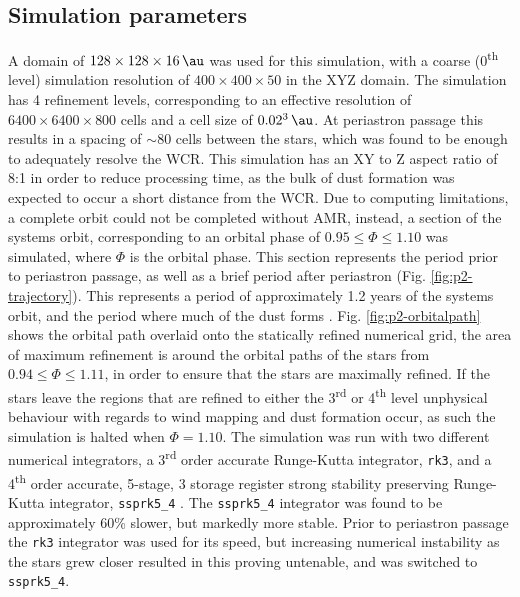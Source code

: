 \documentclass[fleqn,usenatbib]{mnras}
\newcommand{\ts}{\textsuperscript}
\begin{document}
\subsection{Simulation parameters}


A domain of $128 \times 128 \times 16 \, \si{\au}$ was used for this simulation, with a coarse (0\ts{th} level) simulation resolution of $400\times 400 \times 50$ in the XYZ domain.
The simulation has 4 refinement levels, corresponding to an effective resolution of $6400 \times 6400 \times 800$ cells and a cell size of $0.02^3 \, \si{\au}$.
At periastron passage this results in a spacing of $\sim 80$ cells between the stars, which was found to be enough to adequately resolve the WCR. 
This simulation has an XY to Z aspect ratio of 8:1 in order to reduce processing time, as the bulk of dust formation was expected to occur a short distance from the WCR.
Due to computing limitations, a complete orbit could not be completed without AMR, instead, a section of the systems orbit, corresponding to an orbital phase of $0.95 \leq \Phi \leq 1.10$ was simulated, where $\Phi$ is the orbital phase.
This section represents the period prior to periastron passage, as well as a brief period after periastron
(Fig. \ref{fig:p2-trajectory}).
This represents a period of approximately \num{1.2} years of the systems orbit, and the period where much of the dust forms \citep{crowther_dust_2003}.
Fig. \ref{fig:p2-orbitalpath} shows the orbital path overlaid onto the statically refined numerical grid, the area of maximum refinement is around the orbital paths of the stars from $0.94 \leq \Phi \leq 1.11$, in order to ensure that the stars are maximally refined.
If the stars leave the regions that are refined to either the 3\ts{rd} or 4\ts{th} level unphysical behaviour with regards to wind mapping and dust formation occur, as such the simulation is halted when $\Phi = 1.10$.
The simulation was run with two different numerical integrators, a 3\ts{rd} order accurate Runge-Kutta integrator, \texttt{rk3}, and a 4\ts{th} order accurate, 5-stage, 3 storage register strong stability preserving Runge-Kutta integrator, \texttt{ssprk5\_4}
\citep{ruuthHighOrderStrongStabilityPreservingRungeKutta2005}.
The \texttt{ssprk5\_4} integrator was found to be approximately 60\% slower, but markedly more stable.
Prior to periastron passage the \texttt{rk3} integrator was used for its speed, but increasing numerical instability as the stars grew closer resulted in this proving untenable, and was switched to \texttt{ssprk5\_4}.
\end{document}
